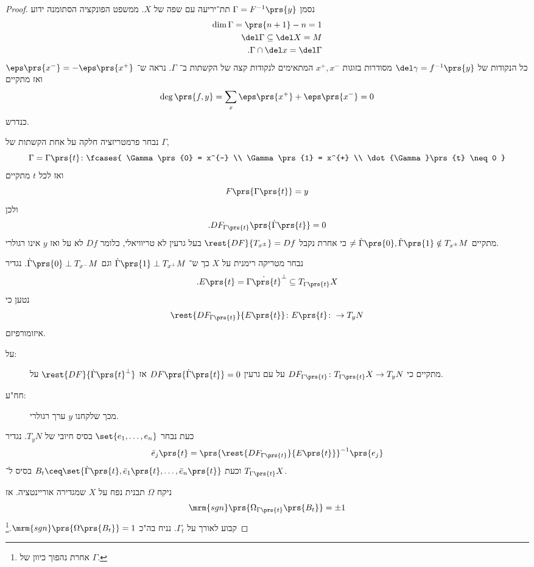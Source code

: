 \documentclass[a4paper,10pt,twoside,openany]{book}
\begin{document}
\begin{proof}
נסמן
$\Gamma = F^{-1}\prs{y}$
תת־יריעה עם שפה של
$X$.
ממשפט הפונקציה הסתומנה ידוע
\begin{align*}
\dim \Gamma = \prs{n+1} - n = 1 \\
\del \Gamma \subseteq \del X = M \\
\text{.} \Gamma \cap \del x = \del \Gamma
\end{align*}
כל הנקודות של
$\del \gamma = f^{-1}\prs{y}$
מסודרות בזוגות
$x^+, x^-$
המתאימים לנקודות קצה של הקשתות ב־%
$\Gamma$.
נראה ש־%
$\eps\prs{x^{-}} = -\eps\prs{x^+}$
ואז מתקיים
\[\deg\prs{f,y} = \sum_x \eps\prs{x^{+}} + \eps\prs{x^{-}} = 0\]
כנדרש.

נבחר פרמטריזציה חלקה על אחת הקשתות של
$\Gamma$,
\[\Gamma = \Gamma\prs{t} \colon \fcases{ \Gamma\prs{0} = x^{-} \\ \Gamma\prs{1} = x^{+} \\ \dot{\Gamma}\prs{t} \neq 0 }\]
ואז לכל
$t$
מתקיים
\[F\prs{\Gamma\prs{t}} = y\]
ולכן
\[\text{.} DF_{\Gamma\prs{t}} \prs{\dot{\Gamma}\prs{t}} = 0\]
מתקיים
$\neq \dot{\Gamma}\prs{0}, \dot{\Gamma}\prs{1} \notin T_{x^{\pm}} M$
כי אחרת נקבל
$\rest{DF}{T_{x^{\pm}}} = Df$
בעל גרעין לא טריוויאלי, כלומר
$Df$
לא על
ואז
$y$
אינו רגולרי.

נבחר מטריקה רימנית על
$X$
כך ש־%
$\dot{\Gamma}\prs{1} \perp T_{x^+}M$
וגם
$\dot{\Gamma}\prs{0} \perp T_{x^{-}}M$.
נגדיר
\[\text{.} E\prs{t} = \dot{\Gamma\prs{t}}^{\perp} \subseteq T_{\Gamma\prs{t}}X\]
נטען כי
\[\rest{DF_{\Gamma\prs{t}}}{E\prs{t}} \colon E\prs{t} \colon \to T_y N\]
איזומורפיזם.

\begin{description}
\item[על:]
מתקיים כי
$DF_{\Gamma\prs{t}} \colon T_{\Gamma\prs{t}} X \to T_y N$
על עם גרעין
$DF\prs{\dot{\Gamma}\prs{t}} = 0$
אז
$\rest{DF}{\dot{\Gamma}\prs{t}^{\perp}}$
על.
\item[חח"ע:]
מכך שלקחנו
$y$
ערך רגולרי.
\end{description}

כעת נבחר
$\set{e_1, \ldots, e_n}$
בסיס חיובי של
$T_y N$.
נגדיר
\[\bar{e}_j \prs{t} = \prs{\rest{DF_{\Gamma\prs{t}}}{E\prs{t}}}^{-1}\prs{e_j}\]
וכעת
$B_t \ceq \set{\dot{\Gamma}\prs{t}, \bar{e}_1\prs{t}, \ldots, \bar{e}_n\prs{t}}$
בסיס ל־%
$T_{\Gamma\prs{t}}X$.

ניקח
$\Omega$
תבנית נפח על
$X$
שמגדירה אוריינטציה.
אז
\[\mrm{sgn}\prs{\Omega_{\Gamma\prs{t}}\prs{B_t}} = \pm 1\]
קבוע לאורך על
$\Gamma_t$.
נניח בה"כ
$\mrm{sgn}\prs{\Omega\prs{B_t}} = 1$.\footnote{אחרת נהפוך כיוון של
$\Gamma$.}


\end{proof}
\end{document}
